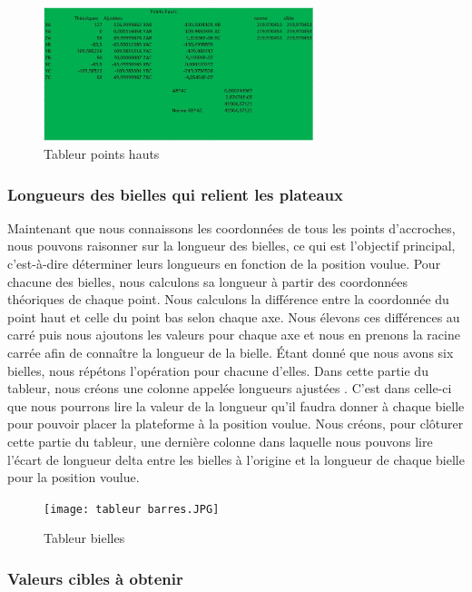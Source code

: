 \documentclass[a4paper,12pt]{article}
\begin{document}
\begin{figure}[H]
  \centering
  \includegraphics[width=0.7\textwidth]{tableur points hauts.jpg}
  \caption{Tableur points hauts}
\end{figure}

\subsubsection{Longueurs des bielles qui relient les plateaux}

Maintenant que nous connaissons les coordonnées de tous les points d'accroches, nous pouvons raisonner sur la longueur des bielles, ce qui est l'objectif principal, c'est-à-dire déterminer leurs longueurs en fonction de la position voulue. 
Pour chacune des bielles, nous calculons sa longueur à partir des coordonnées théoriques de chaque point. 
Nous calculons la différence entre la coordonnée du point haut et celle du point bas selon chaque axe. 
Nous élevons ces différences au carré puis nous ajoutons les valeurs pour chaque axe et nous en prenons la racine carrée afin de connaître la longueur de la bielle. 
Étant donné que nous avons six bielles, nous répétons l'opération pour chacune d'elles. 
Dans cette partie du tableur, nous créons une colonne appelée \og longueurs ajustées \fg . 
C'est dans celle-ci que nous pourrons lire la valeur de la longueur qu'il faudra donner à chaque bielle pour pouvoir placer la plateforme à la position voulue. 
Nous créons, pour clôturer cette partie du tableur, une dernière colonne dans laquelle nous pouvons lire l'écart de longueur delta entre les bielles à l'origine et la longueur de chaque bielle pour la position voulue.


\begin{figure}[H]
  \centering
  \texttt{[image: tableur barres.JPG]}
  \caption{Tableur bielles}
\end{figure}

\subsubsection{Valeurs cibles à obtenir}
\end{document}
